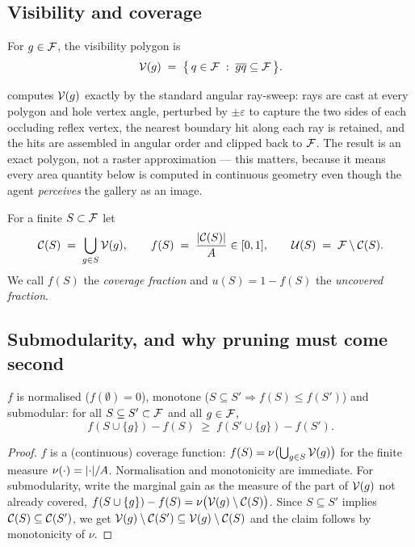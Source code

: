 \documentclass[11pt,a4paper]{article}
\begin{document}
\subsection{Visibility and coverage}

\begin{definition}
For $g \in \mathcal{F}$, the visibility polygon is
\[
  \mathcal{V}(g) \;=\; \bigl\{\, q \in \mathcal{F} \;:\; \overline{gq} \subseteq \mathcal{F} \,\bigr\}.
\]
\end{definition}

 computes $\mathcal{V}(g)$ exactly by the standard
angular ray-sweep: rays are cast at every polygon and hole vertex angle, perturbed by
$\pm\varepsilon$ to capture the two sides of each occluding reflex vertex, the nearest
boundary hit along each ray is retained, and the hits are assembled in angular order and
clipped back to $\mathcal{F}$. The result is an exact polygon, not a raster approximation ---
this matters, because it means every area quantity below is computed in continuous
geometry even though the agent \emph{perceives} the gallery as an image.

\begin{definition}
For a finite $S \subset \mathcal{F}$ let
\[
  \mathcal{C}(S) \;=\; \bigcup_{g \in S} \mathcal{V}(g),
  \qquad
  f(S) \;=\; \frac{\lvert \mathcal{C}(S) \rvert}{A} \in [0,1],
  \qquad
  \mathcal{U}(S) \;=\; \mathcal{F} \setminus \mathcal{C}(S).
\]
We call $f(S)$ the \emph{coverage fraction} and $u(S) = 1 - f(S)$ the \emph{uncovered
fraction}.
\end{definition}

\subsection{Submodularity, and why pruning must come second}

\begin{proposition}\label{prop:submod}
$f$ is normalised ($f(\emptyset) = 0$), monotone ($S \subseteq S' \Rightarrow f(S) \le f(S')$)
and submodular: for all $S \subseteq S' \subset \mathcal{F}$ and all $g \in \mathcal{F}$,
\[
  f(S \cup \{g\}) - f(S) \;\ge\; f(S' \cup \{g\}) - f(S').
\]
\end{proposition}

\begin{proof}
$f$ is a (continuous) coverage function: $f(S) = \nu\bigl(\bigcup_{g \in S} \mathcal{V}(g)\bigr)$
for the finite measure $\nu(\cdot) = \lvert \cdot \rvert/A$. Normalisation and monotonicity are
immediate. For submodularity, write the marginal gain as the measure of the part of
$\mathcal{V}(g)$ not already covered,
$f(S \cup \{g\}) - f(S) = \nu\bigl(\mathcal{V}(g) \setminus \mathcal{C}(S)\bigr)$.
Since $S \subseteq S'$ implies $\mathcal{C}(S) \subseteq \mathcal{C}(S')$, we get
$\mathcal{V}(g)\setminus\mathcal{C}(S') \subseteq \mathcal{V}(g)\setminus\mathcal{C}(S)$ and the claim follows by
monotonicity of $\nu$.
\end{proof}
\end{document}
